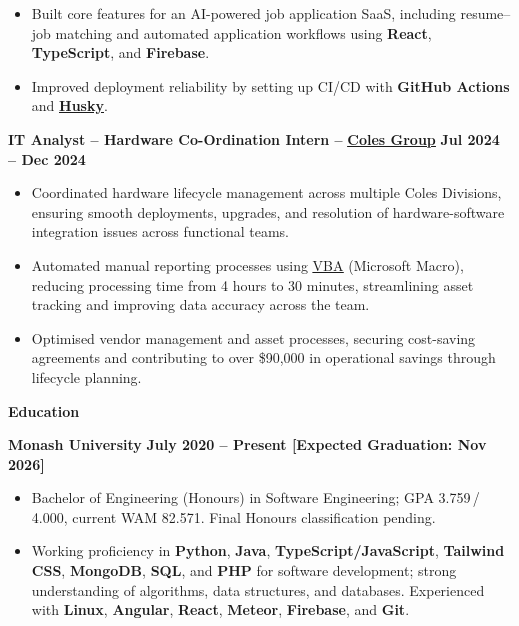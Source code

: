 \documentclass[11pt, a4paper]{article}
\let\hrefnoul\href
\renewcommand{\href}[2]{\hrefnoul{#1}{\ul{#2}}}
\newcommand{\resumesection}[1]{%
  \vspace{6pt}\par
  {\setlength{\fboxsep}{5pt}%
   \noindent\colorbox{sectionbg}{%
     \parbox{\dimexpr\linewidth-10pt\relax}{\strut\textbf{\large #1}\strut}%
   }}%
  \vspace{2pt}\par
}
\begin{document}
\begin{itemize}[leftmargin=1.5em, itemsep=2pt, topsep=1pt, parsep=0pt]
  \item Built core features for an AI-powered job application SaaS, including resume--job matching
        and automated application workflows using \textbf{React}, \textbf{TypeScript}, and
        \textbf{Firebase}.

  \item Improved deployment reliability by setting up CI/CD with \textbf{GitHub Actions} and
        \href{https://typicode.github.io/husky/}{\textbf{Husky}}.
\end{itemize}

\vspace{4pt}
\noindent\textbf{IT Analyst – Hardware Co-Ordination Intern –}
\href{https://www.linkedin.com/company/colesgroup/posts/?feedView=all}{\textbf{Coles Group}}%
\hfill\textbf{Jul 2024 – Dec 2024}

\begin{itemize}[leftmargin=1.5em, itemsep=2pt, topsep=1pt, parsep=0pt]
  \item Coordinated hardware lifecycle management across multiple Coles Divisions, ensuring smooth
        deployments, upgrades, and resolution of hardware-software integration issues across
        functional teams.

  \item Automated manual reporting processes using
        \href{https://learn.microsoft.com/en-us/office/vba/library-reference/concepts/getting-started-with-vba-in-office}{VBA}
        (Microsoft Macro), reducing processing time from 4 hours to 30 minutes, streamlining
        asset tracking and improving data accuracy across the team.

  \item Optimised vendor management and asset processes, securing cost-saving agreements and
        contributing to over \$90,000 in operational savings through lifecycle planning.
\end{itemize}

\resumesection{Education}

\noindent\textbf{Monash University}%
\hfill\textbf{July 2020 – Present [Expected Graduation: Nov 2026]}

\begin{itemize}[leftmargin=1.5em, itemsep=2pt, topsep=1pt, parsep=0pt]
  \item Bachelor of Engineering (Honours) in Software Engineering; GPA 3.759\,/\,4.000,
        current WAM 82.571. Final Honours classification pending.

  \item Working proficiency in \textbf{Python}, \textbf{Java}, \textbf{TypeScript/JavaScript},
        \textbf{Tailwind CSS}, \textbf{MongoDB}, \textbf{SQL}, and \textbf{PHP} for software
        development; strong understanding of algorithms, data structures, and databases.
        Experienced with \textbf{Linux}, \textbf{Angular}, \textbf{React}, \textbf{Meteor},
        \textbf{Firebase}, and \textbf{Git}.
\end{itemize}
\end{document}

